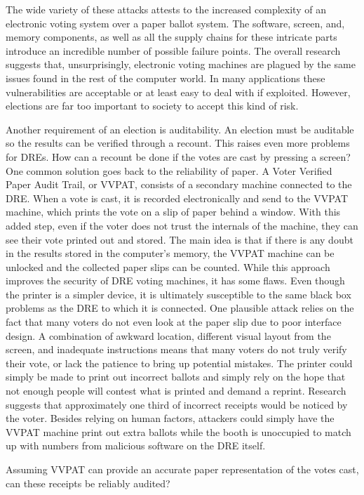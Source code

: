 \documentclass[12pt, titlepage]{article}
\begin{document}
The wide variety of these attacks attests to the increased complexity of an electronic voting system over a paper ballot system. The software, screen, and, memory components, as well as all the supply chains for these intricate parts introduce an incredible number of possible failure points. The overall research suggests that, unsurprisingly, electronic voting machines are plagued by the same issues found in the rest of the computer world. In many applications these vulnerabilities are acceptable or at least easy to deal with if exploited. However, elections are far too important to society to accept this kind of risk. 

Another requirement of an election is auditability. An election must be auditable so the results can be verified through a recount. This raises even more problems for DREs. How can a recount be done if the votes are cast by pressing a screen? One common solution goes back to the reliability of paper. A Voter Verified Paper Audit Trail, or VVPAT, consists of a secondary machine connected to the DRE. When a vote is cast, it is recorded electronically and send to the VVPAT machine, which prints the vote on a slip of paper behind a window. With this added step, even if the voter does not trust the internals of the machine, they can see their vote printed out and stored. The main idea is that if there is any doubt in the results stored in the computer's memory, the VVPAT machine can be unlocked and the collected paper slips can be counted. While this approach improves the security of DRE voting machines, it has some flaws. Even though the printer is a simpler device, it is ultimately susceptible to the same black box problems as the DRE to which it is connected. One plausible attack relies on the fact that many voters do not even look at the paper slip due to poor interface design. A combination of awkward location, different visual layout from the screen, and inadequate instructions means that many voters do not truly verify their vote, or lack the patience to bring up potential mistakes. \cite{selker2004security} The printer could simply be made to print out incorrect ballots and simply rely on the hope that not enough people will contest what is printed and demand a reprint. Research suggests that approximately one third of incorrect receipts would be noticed by the voter. \cite{selker2004security} Besides relying on human factors, attackers could simply have the VVPAT machine print out extra ballots while the booth is unoccupied to match up with numbers from malicious software on the DRE itself.

Assuming VVPAT can provide an accurate paper representation of the votes cast, can these receipts be reliably audited?

\newpage
\printbibliography
\end{document}
